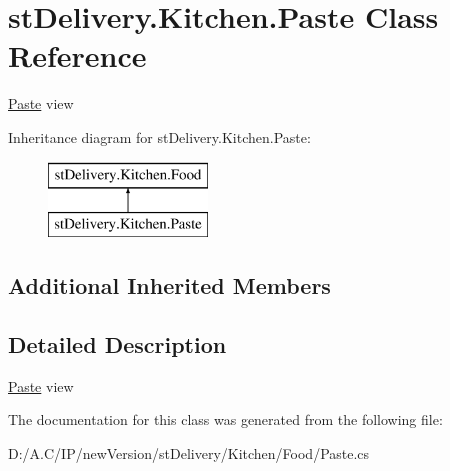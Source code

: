\hypertarget{classst_delivery_1_1_kitchen_1_1_paste}{}\section{st\+Delivery.\+Kitchen.\+Paste Class Reference}
\label{classst_delivery_1_1_kitchen_1_1_paste}


\hyperlink{classst_delivery_1_1_kitchen_1_1_paste}{Paste} view  


Inheritance diagram for st\+Delivery.\+Kitchen.\+Paste\+:\begin{figure}[H]
\begin{center}
\leavevmode
\includegraphics[height=2.000000cm]{classst_delivery_1_1_kitchen_1_1_paste}
\end{center}
\end{figure}
\subsection*{Additional Inherited Members}


\subsection{Detailed Description}
\hyperlink{classst_delivery_1_1_kitchen_1_1_paste}{Paste} view 



The documentation for this class was generated from the following file\+:\begin{DoxyCompactItemize}
\item 
D\+:/\+A.\+C/\+I\+P/new\+Version/st\+Delivery/\+Kitchen/\+Food/Paste.\+cs\end{DoxyCompactItemize}
